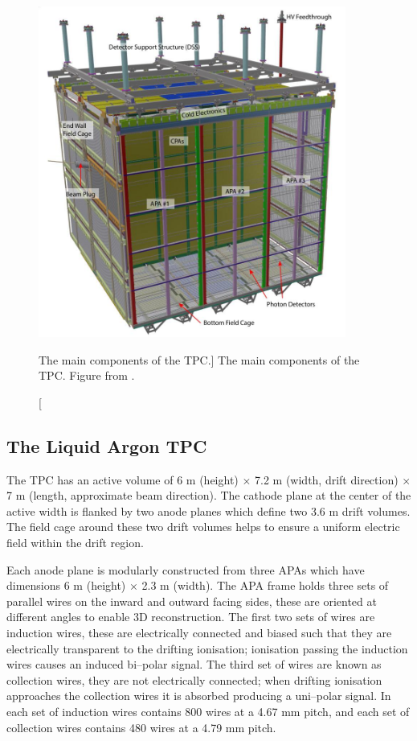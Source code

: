 \begin{figure}

	\centering

	\includegraphics[width=0.9\textwidth]{figures/pdsp_tpc.jpg}

	\caption
	[The main components of the \protodune{} TPC.]
	{The main components of the \protodune{} TPC. Figure from \cite{Abi2017}.}

	\label{fig:pdsp_tpc}

\end{figure}

\subsection{The Liquid Argon TPC}

The \protodune{} TPC has an active volume of 6 m (height) $\times$ 7.2 m (width,
drift direction) $\times$ 7 m (length, approximate beam direction). The cathode 
plane at the center of the active width is flanked by two anode planes which 
define two 3.6 m drift volumes. The field cage around these two drift volumes
helps to ensure a uniform electric field within the drift region.

Each anode plane is modularly constructed from three APAs which have dimensions
6 m (height) $\times$ 2.3 m (width). The APA frame holds three sets of parallel
wires on the inward and outward facing sides, these are oriented at different 
angles to enable 3D reconstruction. The first two sets of wires are induction
wires, these are electrically connected and biased such that they are
electrically transparent to the drifting ionisation; ionisation passing the
induction wires causes an induced bi--polar signal. The third set of wires are 
known as collection wires, they are not electrically connected; when drifting 
ionisation approaches the collection wires it is absorbed producing a 
uni--polar signal. In \protodune{} each set of induction wires contains 800
wires at a 4.67 mm pitch, and each set of collection wires contains 480 wires at
a 4.79 mm pitch. 

